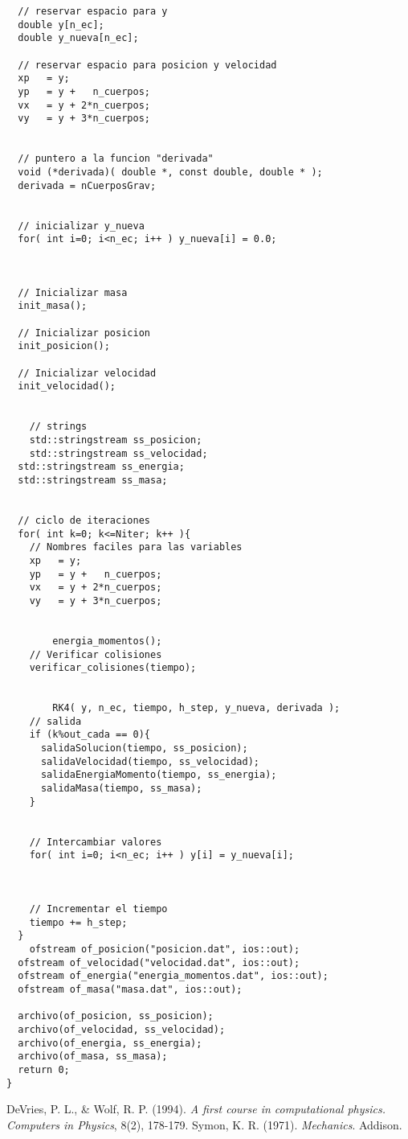 \begin{lstlisting}
  // reservar espacio para y
  double y[n_ec];
  double y_nueva[n_ec];

  // reservar espacio para posicion y velocidad
  xp   = y;
  yp   = y +   n_cuerpos;
  vx   = y + 2*n_cuerpos;
  vy   = y + 3*n_cuerpos;


  // puntero a la funcion "derivada"
  void (*derivada)( double *, const double, double * );
  derivada = nCuerposGrav;


  // inicializar y_nueva
  for( int i=0; i<n_ec; i++ ) y_nueva[i] = 0.0;



  // Inicializar masa
  init_masa();

  // Inicializar posicion
  init_posicion();

  // Inicializar velocidad
  init_velocidad();


	// strings
	std::stringstream ss_posicion;
	std::stringstream ss_velocidad;
  std::stringstream ss_energia;
  std::stringstream ss_masa;


  // ciclo de iteraciones
  for( int k=0; k<=Niter; k++ ){
    // Nombres faciles para las variables
    xp   = y;
    yp   = y +   n_cuerpos;
    vx   = y + 2*n_cuerpos;
    vy   = y + 3*n_cuerpos;


		energia_momentos();
    // Verificar colisiones
    verificar_colisiones(tiempo);


		RK4( y, n_ec, tiempo, h_step, y_nueva, derivada );
    // salida
    if (k%out_cada == 0){
      salidaSolucion(tiempo, ss_posicion);
      salidaVelocidad(tiempo, ss_velocidad);
      salidaEnergiaMomento(tiempo, ss_energia);
      salidaMasa(tiempo, ss_masa);
    }


    // Intercambiar valores
    for( int i=0; i<n_ec; i++ ) y[i] = y_nueva[i];



    // Incrementar el tiempo
    tiempo += h_step;
  }
	ofstream of_posicion("posicion.dat", ios::out);
  ofstream of_velocidad("velocidad.dat", ios::out);
  ofstream of_energia("energia_momentos.dat", ios::out);
  ofstream of_masa("masa.dat", ios::out);

  archivo(of_posicion, ss_posicion);
  archivo(of_velocidad, ss_velocidad);
  archivo(of_energia, ss_energia);
  archivo(of_masa, ss_masa);
  return 0;
}

\end{lstlisting}




\nocite{*}
%
%

\begin{thebibliography}{00}
 DeVries, P. L., \& Wolf, R. P. (1994). \textit{A first course in computational physics. Computers in Physics}, 8(2), 178-179.
 Symon, K. R. (1971). \textit{Mechanics}. Addison.
\end{thebibliography}






